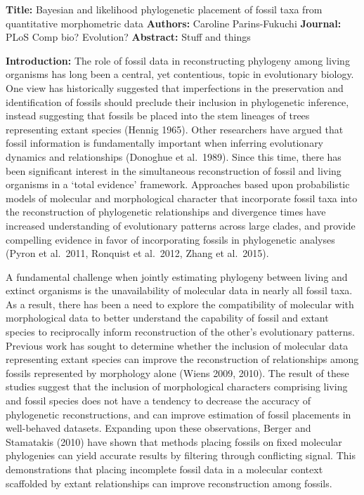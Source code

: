 \documentclass[12pt]{article}
\begin{document}
\textbf{Title:} Bayesian and likelihood phylogenetic placement of fossil
taxa from quantitative morphometric data \textbf{Authors:} Caroline
Parins-Fukuchi \textbf{Journal:} PLoS Comp bio? Evolution?
\textbf{Abstract:} Stuff and things

\textbf{Introduction:} The role of fossil data in reconstructing
phylogeny among living organisms has long been a central, yet
contentious, topic in evolutionary biology. One view has historically
suggested that imperfections in the preservation and identification of
fossils should preclude their inclusion in phylogenetic inference,
instead suggesting that fossils be placed into the stem lineages of
trees representing extant species (Hennig 1965). Other researchers have
argued that fossil information is fundamentally important when inferring
evolutionary dynamics and relationships (Donoghue et al.~1989). Since
this time, there has been significant interest in the simultaneous
reconstruction of fossil and living organisms in a `total evidence'
framework. Approaches based upon probabilistic models of molecular and
morphological character that incorporate fossil taxa into the
reconstruction of phylogenetic relationships and divergence times have
increased understanding of evolutionary patterns across large clades,
and provide compelling evidence in favor of incorporating fossils in
phylogenetic analyses (Pyron et al.~2011, Ronquist et al.~2012, Zhang et
al.~2015).

A fundamental challenge when jointly estimating phylogeny between living
and extinct organisms is the unavailability of molecular data in nearly
all fossil taxa. As a result, there has been a need to explore the
compatibility of molecular with morphological data to better understand
the capability of fossil and extant species to reciprocally inform
reconstruction of the other's evolutionary patterns. Previous work has
sought to determine whether the inclusion of molecular data representing
extant species can improve the reconstruction of relationships among
fossils represented by morphology alone (Wiens 2009, 2010). The result
of these studies suggest that the inclusion of morphological characters
comprising living and fossil species does not have a tendency to
decrease the accuracy of phylogenetic reconstructions, and can improve
estimation of fossil placements in well-behaved datasets. Expanding upon
these observations, Berger and Stamatakis (2010) have shown that methods
placing fossils on fixed molecular phylogenies can yield accurate
results by filtering through conflicting signal. This demonstrations
that placing incomplete fossil data in a molecular context scaffolded by
extant relationships can improve reconstruction among fossils.
\end{document}
